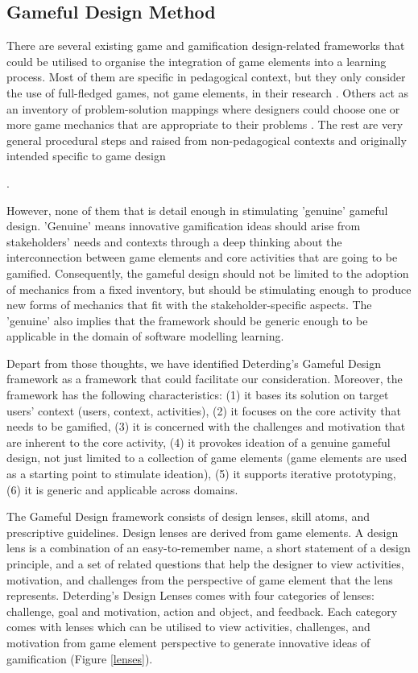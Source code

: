 \documentclass[12pt, a4paper]{report}
\begin{document}
\subsection{Gameful Design Method}
There are several existing game and gamification design-related frameworks that could be utilised to organise the integration of game elements into a learning process. Most of them are specific in pedagogical context, but they only consider the use of full-fledged games, not game elements, in their research \cite{garris2002games, yusoff2009conceptual, de2011serious}. Others act as an inventory of problem-solution mappings where designers could choose one or more game mechanics that are appropriate to their problems \cite{arnab2015mapping, chou2013octalysis}. The rest are very general procedural steps and raised from non-pedagogical contexts \cite{werbach2012win, kumar2013framework, huang2013gamification} and originally intended specific to game design {\cite{hunicke2004mda}. 

However, none of them that is detail enough in stimulating 'genuine' gameful design. 'Genuine' means innovative gamification ideas should arise from stakeholders' needs and contexts through a deep thinking about the interconnection between game elements and core activities that are going to be gamified. Consequently, the gameful design should not be limited to the adoption of mechanics from a fixed inventory, but should be stimulating enough to produce new forms of mechanics that fit with the stakeholder-specific aspects. The 'genuine' also implies that the framework should be generic enough to be applicable in the domain of software modelling learning.

Depart from those thoughts, we have identified Deterding's Gameful Design framework \cite{deterding2015lens} as a framework that could facilitate our consideration.  Moreover, the framework has the following characteristics: (1) it bases its solution on target users' context (users, context, activities), (2) it focuses on the core activity that needs to be gamified, (3) it is concerned with the challenges and motivation that are inherent to the core activity, (4) it provokes ideation of a genuine gameful design, not just limited to a collection of game elements (game elements are used as a starting point to stimulate ideation), (5) it supports iterative prototyping, (6) it is generic and applicable across domains.               

The Gameful Design framework consists of design lenses, skill atoms, and prescriptive guidelines. Design lenses are derived from game elements. A design lens is a combination of an easy-to-remember name, a short statement of a design principle, and a set of related questions that help the designer to view activities, motivation, and challenges from the perspective of game element that the lens represents. Deterding's Design Lenses comes with four categories of lenses: challenge, goal and motivation, action and object, and feedback. Each category comes with lenses which can be utilised to view activities, challenges, and motivation from game element perspective to generate innovative ideas of gamification (Figure \ref{lenses}). 

}
\end{document}
